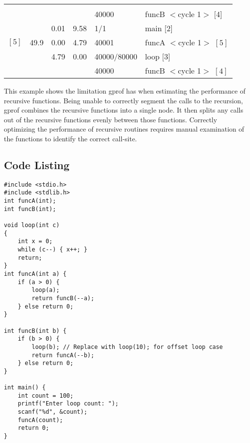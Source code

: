 \documentclass[11pt]{article}
\begin{document}
\begin{table}[H]
\begin{tabular}{l l  l l l l}
\hline \\
                           &&&&    40000    &         funcB $<$cycle 1$>$ $[$4$]$\\
              &&  0.01   & 9.58    &   1/1       &    main $[$2$]$\\
$[5]$  &  49.9  &  0.00   & 4.79  & 40001     &    funcA $<$cycle 1$>$ $[5]$\\
           &&     4.79   & 0.00   &40000/80000    &   loop $[$3$]$\\
                  &&&&             40000       &      funcB $<$cycle 1$>$ $[4]$\\
\hline 
\end{tabular}
\end{table}

This example shows the limitation gprof has when estimating the performance of recursive functions.  Being unable to correctly segment the calls to the recursion, gprof combines the recursive functions into a single node. It then splits any calls out of the recursive functions evenly between those functions. Correctly optimizing the performance of recursive routines requires manual examination of the functions to identify the correct call-site.
\newpage

\subsection*{Code Listing}

\begin{lstlisting}
#include <stdio.h>
#include <stdlib.h>
int funcA(int);
int funcB(int);

void loop(int c)
{
	int x = 0;
	while (c--) { x++; }
	return;
}
int funcA(int a) {
	if (a > 0) {
		loop(a);
		return funcB(--a);
	} else return 0;
}

int funcB(int b) {
	if (b > 0) {
		loop(b); // Replace with loop(10); for offset loop case
		return funcA(--b);
	} else return 0;
}

int main() {
	int count = 100;
	printf("Enter loop count: ");
	scanf("%d", &count);
	funcA(count);
	return 0;
}
\end{lstlisting}
\end{document}
